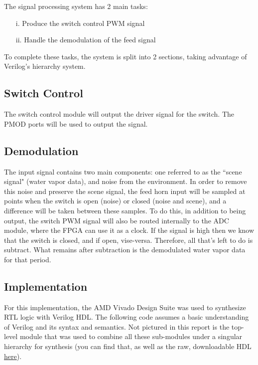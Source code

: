 \documentclass[titlepage]{article}
\begin{document}
The signal processing system has 2 main tasks:
\begin{itemize}
    \item[i.] Produce the switch control PWM signal
    \item[ii.] Handle the demodulation of the feed signal
\end{itemize}
To complete these tasks, the system is split into 2 sections, taking advantage of Verilog's hierarchy system.


\subsection{Switch Control}
\label{DSD switch control}

The switch control module will output the driver signal for the switch. The PMOD ports will be used to output the signal.


\subsection{Demodulation}
\label{DSD demod}

The input signal contains two main components: one referred to as the ``scene signal" (water vapor data), and noise from the environment. In order to remove this noise and preserve the scene signal, the feed horn input will be sampled at points when the switch is open (noise) or closed (noise and scene), and a difference will be taken between these samples. To do this, in addition to being output, the switch PWM signal will also be routed internally to the ADC module, where the FPGA can use it as a clock. If the signal is high then we know that the switch is closed, and if open, vise-versa. Therefore, all that's left to do is subtract. What remains after subtraction is the demodulated water vapor data for that period.

\subsection{Implementation}
\label{DSD implementation overview}

For this implementation, the AMD Vivado Design Suite was used to synthesize RTL logic with Verilog HDL. The following code assumes a basic understanding of Verilog and its syntax and semantics. Not pictured in this report is the top-level module that was used to combine all these sub-modules under a singular hierarchy for synthesis (you can find that, as well as the raw, downloadable HDL \href{https://github.com/ptrichr/CISESS-2024/tree/main}{here}).
\end{document}
